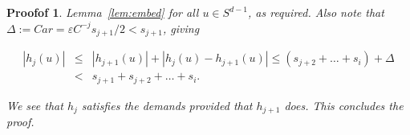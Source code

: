 \documentclass[10pt,a4paper]{amsart}
\newtheorem{proofof}{Proofof}
\newcommand{\eps}{\varepsilon}
\begin{document}
\begin{proofof}{Lemma~\ref{lem:embed}}
\noindent
for all $u \in S^{d-1}$, as
required.
Also note that $\Delta := Car = \eps C^{-j} s_{j+1}/2 < s_{j+1}$, giving

$$ \begin{array}{rcl} 
|h_j(u)| 
& \leq & 
|h_{j+1}(u)| + |h_j(u)-h_{j+1}(u)| \leq 
(s_{j+2} + \dots + s_i) + \Delta \\ 
& < & 
s_{j+1} + s_{j+2} + \dots + s_i. 
\end{array} $$

\noindent
We see that $h_j$ satisfies the demands provided that $h_{j+1}$ does. This concludes the proof.
\end{proofof}
\end{document}
